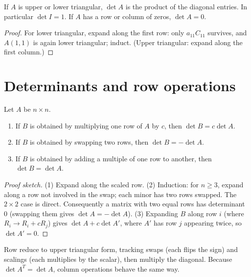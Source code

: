 \begin{theorem}
If $A$ is upper or lower triangular, $\det A$ is the product of the diagonal entries. In particular
$\det I=1$. If $A$ has a row or column of zeros, $\det A=0$.
\end{theorem}
\begin{proof}
For lower triangular, expand along the first row: only $a_{11}C_{11}$ survives, and $A(1,1)$ is again lower
triangular; induct. (Upper triangular: expand along the first column.)
\end{proof}

\section{Determinants and row operations}

\begin{theorem}
Let $A$ be $n\times n$.
\begin{enumerate}
  \item If $B$ is obtained by multiplying one row of $A$ by $c$, then $\det B=c\det A$.
  \item If $B$ is obtained by swapping two rows, then $\det B=-\det A$.
  \item If $B$ is obtained by adding a multiple of one row to another, then $\det B=\det A$.
\end{enumerate}
\end{theorem}
\begin{proof}[Proof sketch]
(1) Expand along the scaled row. (2) Induction: for $n\ge3$, expand along a row not involved in the swap; each
minor has two rows swapped. The $2\times2$ case is direct. Consequently a matrix with two equal rows has
determinant $0$ (swapping them gives $\det A=-\det A$). (3) Expanding $B$ along row $i$ (where
$R_i\to R_i+cR_j$) gives $\det A + c\det A'$, where $A'$ has row $j$ appearing twice, so $\det A'=0$.
\end{proof}

\begin{important}[Strategy]
Row reduce to upper triangular form, tracking swaps (each flips the sign) and scalings (each multiplies
by the scalar), then multiply the diagonal. Because $\det A^T=\det A$, column operations behave the same way.
\end{important}

